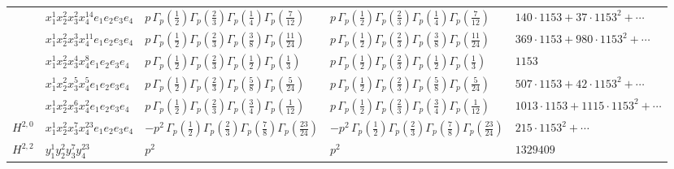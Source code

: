 \documentclass[11pt]{article}
\begin{document}
\begin{table}[ht]
{\begin{tabular}{@{}lllll@{}}
 & $x_{1}^{1} x_{2}^{2} x_{3}^{2} x_{4}^{14}  e_{1} e_{2} e_{3} e_{4}$ & $p \, \Gamma_p \left( \frac{1}{2} \right) \Gamma_p \left( \frac{2}{3} \right) \Gamma_p \left( \frac{1}{4} \right) \Gamma_p \left( \frac{7}{12} \right)$ & $p \, \Gamma_p \left( \frac{1}{2} \right) \Gamma_p \left( \frac{2}{3} \right) \Gamma_p \left( \frac{1}{4} \right) \Gamma_p \left( \frac{7}{12} \right)$ & $140{\cdot}1153{+}37{\cdot}1153^{2}{+}\cdots$ \\
 & $x_{1}^{1} x_{2}^{2} x_{3}^{3} x_{4}^{11}  e_{1} e_{2} e_{3} e_{4}$ & $p \, \Gamma_p \left( \frac{1}{2} \right) \Gamma_p \left( \frac{2}{3} \right) \Gamma_p \left( \frac{3}{8} \right) \Gamma_p \left( \frac{11}{24} \right)$ & $p \, \Gamma_p \left( \frac{1}{2} \right) \Gamma_p \left( \frac{2}{3} \right) \Gamma_p \left( \frac{3}{8} \right) \Gamma_p \left( \frac{11}{24} \right)$ & $369{\cdot}1153{+}980{\cdot}1153^{2}{+}\cdots$ \\
 & $x_{1}^{1} x_{2}^{2} x_{3}^{4} x_{4}^{8}  e_{1} e_{2} e_{3} e_{4}$ & $p \, \Gamma_p \left( \frac{1}{2} \right) \Gamma_p \left( \frac{2}{3} \right) \Gamma_p \left( \frac{1}{2} \right) \Gamma_p \left( \frac{1}{3} \right)$ & $p \, \Gamma_p \left( \frac{1}{2} \right) \Gamma_p \left( \frac{2}{3} \right) \Gamma_p \left( \frac{1}{2} \right) \Gamma_p \left( \frac{1}{3} \right)$ & $1153$ \\
 & $x_{1}^{1} x_{2}^{2} x_{3}^{5} x_{4}^{5}  e_{1} e_{2} e_{3} e_{4}$ & $p \, \Gamma_p \left( \frac{1}{2} \right) \Gamma_p \left( \frac{2}{3} \right) \Gamma_p \left( \frac{5}{8} \right) \Gamma_p \left( \frac{5}{24} \right)$ & $p \, \Gamma_p \left( \frac{1}{2} \right) \Gamma_p \left( \frac{2}{3} \right) \Gamma_p \left( \frac{5}{8} \right) \Gamma_p \left( \frac{5}{24} \right)$ & $507{\cdot}1153{+}42{\cdot}1153^{2}{+}\cdots$ \\
 & $x_{1}^{1} x_{2}^{2} x_{3}^{6} x_{4}^{2}  e_{1} e_{2} e_{3} e_{4}$ & $p \, \Gamma_p \left( \frac{1}{2} \right) \Gamma_p \left( \frac{2}{3} \right) \Gamma_p \left( \frac{3}{4} \right) \Gamma_p \left( \frac{1}{12} \right)$ & $p \, \Gamma_p \left( \frac{1}{2} \right) \Gamma_p \left( \frac{2}{3} \right) \Gamma_p \left( \frac{3}{4} \right) \Gamma_p \left( \frac{1}{12} \right)$ & $1013{\cdot}1153{+}1115{\cdot}1153^{2}{+}\cdots$ \\
\midrule
$H^{2,0}$ & $x_{1}^{1} x_{2}^{2} x_{3}^{7} x_{4}^{23}  e_{1} e_{2} e_{3} e_{4}$ & $- p^{2} \, \Gamma_p \left( \frac{1}{2} \right) \Gamma_p \left( \frac{2}{3} \right) \Gamma_p \left( \frac{7}{8} \right) \Gamma_p \left( \frac{23}{24} \right)$ & $- p^{2} \, \Gamma_p \left( \frac{1}{2} \right) \Gamma_p \left( \frac{2}{3} \right) \Gamma_p \left( \frac{7}{8} \right) \Gamma_p \left( \frac{23}{24} \right)$ & $215{\cdot}1153^{2}{+}\cdots$ \\
\midrule
$H^{2,2}$ & $y_{1}^{1} y_{2}^{2} y_{3}^{7} y_{4}^{23}$ & $p^{2} \,$ & $p^{2} \,$ & $1329409$ \\
\bottomrule
\end{tabular}
}
\renewcommand{\arraystretch}{1.0}
\end{table}
\end{document}
